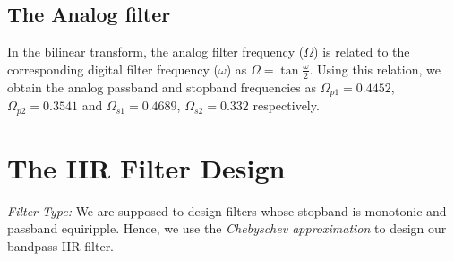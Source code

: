 \documentclass{article}
\begin{document}
\subsection{The Analog filter}
In the bilinear transform, the analog filter frequency ($\Omega$) is related to the corresponding digital filter frequency ($\omega$) as $\Omega = \tan \frac{\omega}{2}$.  Using this relation, we obtain the analog passband and stopband frequencies as $\Omega_{p1} = 0.4452$, $\Omega_{p2} = 0.3541$ and $\Omega_{s1} = 0.4689$, $\Omega_{s2} = 0.332$
respectively.

\section{The IIR Filter Design}
{\em Filter Type:}  We are supposed to design filters whose stopband is monotonic and passband equiripple.  
Hence, we use the {\em Chebyschev approximation} to design our bandpass IIR filter.
\end{document}
